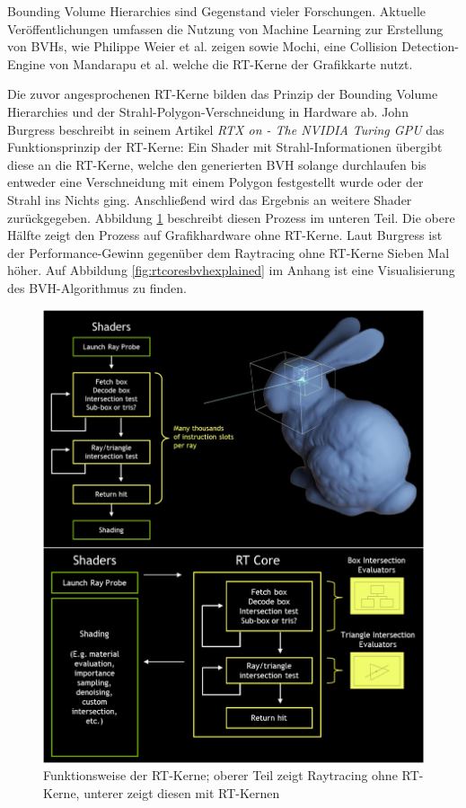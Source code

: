 \documentclass[11pt]{scrartcl}
\begin{document}
	Bounding Volume Hierarchies sind Gegenstand vieler Forschungen. Aktuelle Veröffentlichungen umfassen die Nutzung von Machine Learning zur Erstellung von BVHs, wie Philippe Weier et al. zeigen\cite{Weier2024} sowie Mochi, eine Collision Detection-Engine von Mandarapu et al. welche die RT-Kerne der Grafikkarte nutzt\cite{Mandarapu2024}.
	
	Die zuvor angesprochenen RT-Kerne bilden das Prinzip der Bounding Volume Hierarchies und der Strahl-Polygon-Verschneidung in Hardware ab. John Burgress beschreibt in seinem Artikel \textit{RTX on - The NVIDIA Turing GPU} das Funktionsprinzip der RT-Kerne: Ein Shader mit Strahl-Informationen übergibt diese an die RT-Kerne, welche den generierten BVH solange durchlaufen bis entweder eine Verschneidung mit einem Polygon festgestellt wurde oder der Strahl ins Nichts ging. Anschließend wird das Ergebnis an weitere Shader zurückgegeben. Abbildung \ref{fig:rtcoresexplained} beschreibt diesen Prozess im unteren Teil. Die obere Hälfte zeigt den Prozess auf Grafikhardware ohne RT-Kerne. Laut Burgress ist der Performance-Gewinn gegenüber dem Raytracing ohne RT-Kerne Sieben Mal höher.\cite{Burgess2020} Auf Abbildung \ref{fig:rtcoresbvhexplained} im Anhang ist eine Visualisierung des BVH-Algorithmus zu finden.
	
	\begin{figure}[h]
		\centering
		\includegraphics[width=0.7\linewidth]{Figures/rt_cores_explained}
		\caption[Funktionsweise der RT-Kerne]{Funktionsweise der RT-Kerne; oberer Teil zeigt Raytracing ohne RT-Kerne, unterer zeigt diesen mit RT-Kernen\cite{Burgess2020}}
		\label{fig:rtcoresexplained}
	\end{figure}
	
\end{document}

